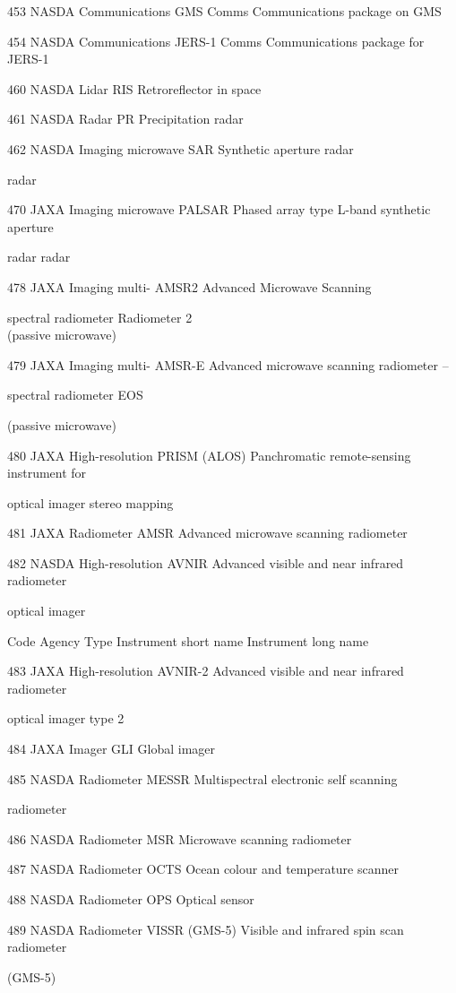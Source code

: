 453 NASDA Communications GMS Comms Communications package on GMS

454 NASDA Communications JERS-1 Comms Communications package for JERS-1

460 NASDA Lidar RIS Retroreflector in space

461 NASDA Radar PR Precipitation radar

462 NASDA Imaging microwave SAR Synthetic aperture radar

radar

470 JAXA Imaging microwave PALSAR Phased array type L-band synthetic aperture

radar radar

478 JAXA Imaging multi- AMSR2 Advanced Microwave Scanning

spectral radiometer Radiometer 2\\
(passive microwave)

479 JAXA Imaging multi- AMSR-E Advanced microwave scanning radiometer --

spectral radiometer EOS

(passive microwave)

480 JAXA High-resolution PRISM (ALOS) Panchromatic remote-sensing instrument for

optical imager stereo mapping

481 JAXA Radiometer AMSR Advanced microwave scanning radiometer

482 NASDA High-resolution AVNIR Advanced visible and near infrared radiometer

optical imager

Code Agency Type Instrument short name Instrument long name

483 JAXA High-resolution AVNIR-2 Advanced visible and near infrared radiometer

optical imager type 2

484 JAXA Imager GLI Global imager

485 NASDA Radiometer MESSR Multispectral electronic self scanning

radiometer

486 NASDA Radiometer MSR Microwave scanning radiometer

487 NASDA Radiometer OCTS Ocean colour and temperature scanner

488 NASDA Radiometer OPS Optical sensor

489 NASDA Radiometer VISSR (GMS-5) Visible and infrared spin scan radiometer

(GMS-5)

